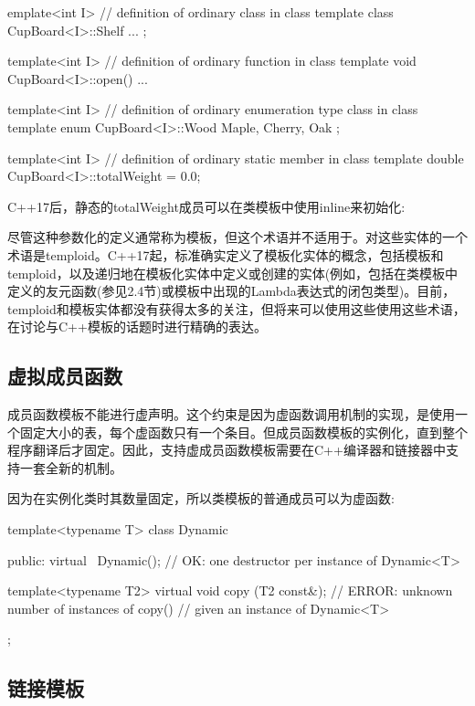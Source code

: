 \begin{cpp}
emplate<int I> // definition of ordinary class in class template
class CupBoard<I>::Shelf {
	...
};

template<int I> // definition of ordinary function in class template
void CupBoard<I>::open()
{
	...
}

template<int I> // definition of ordinary enumeration type class in class template
enum CupBoard<I>::Wood {
	Maple, Cherry, Oak
};

template<int I> // definition of ordinary static member in class template
double CupBoard<I>::totalWeight = 0.0;
\end{cpp}

C++17后，静态的totalWeight成员可以在类模板中使用inline来初始化:

\begin{cpp}
template<int I>
class CupBoard
	...
	inline static double totalWeight = 0.0;
};
\end{cpp}

尽管这种参数化的定义通常称为模板，但这个术语并不适用于。对这些实体的一个术语是temploid。C++17起，标准确实定义了模板化实体的概念，包括模板和temploid，以及递归地在模板化实体中定义或创建的实体(例如，包括在类模板中定义的友元函数(参见2.4节)或模板中出现的Lambda表达式的闭包类型)。目前，temploid和模板实体都没有获得太多的关注，但将来可以使用这些使用这些术语，在讨论与C++模板的话题时进行精确的表达。

\subsection{虚拟成员函数}

成员函数模板不能进行虚声明。这个约束是因为虚函数调用机制的实现，是使用一个固定大小的表，每个虚函数只有一个条目。但成员函数模板的实例化，直到整个程序翻译后才固定。因此，支持虚成员函数模板需要在C++编译器和链接器中支持一套全新的机制。

因为在实例化类时其数量固定，所以类模板的普通成员可以为虚函数:

\begin{cpp}
template<typename T>
class Dynamic {
	public:
	virtual ~Dynamic(); // OK: one destructor per instance of Dynamic<T>
	
	template<typename T2>
	virtual void copy (T2 const&);
						// ERROR: unknown number of instances of copy()
						// given an instance of Dynamic<T>
};
\end{cpp}

\subsection{链接模板}

